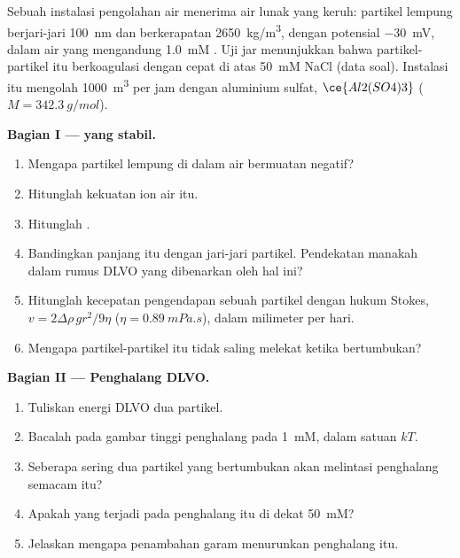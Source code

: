 \begin{problem}
\label{pb:b3:colloids:1}
Sebuah instalasi pengolahan air menerima air lunak yang keruh: partikel lempung
berjari-jari \qty{100}{nm} dan berkerapatan \qty{2650}{kg/m^3}, dengan potensial  \qty{-30}{mV}, dalam
air yang mengandung \qty{1.0}{mM} . Uji jar menunjukkan bahwa partikel-partikel itu berkoagulasi
dengan cepat di atas \qty{50}{mM} NaCl (data soal). Instalasi itu mengolah \qty{1000}{m^3} per
jam dengan aluminium sulfat, $\ce{Al2(SO4)3}$ ($M = \qty{342.3}{g/mol}$).

\medskip\noindent\textbf{Bagian I ---  yang stabil.}
\begin{enumerate}[beginpenalty=10000]
  \item Mengapa partikel lempung di dalam air bermuatan negatif?
  \item Hitunglah kekuatan ion air itu.
  \item Hitunglah .
  \item Bandingkan panjang itu dengan jari-jari partikel. Pendekatan manakah dalam rumus DLVO
        yang dibenarkan oleh hal ini?
  \item Hitunglah kecepatan pengendapan sebuah partikel dengan hukum Stokes, $v =
        2\Delta\rho\,gr^2/9\eta$ ($\eta = \qty{0.89}{mPa.s}$), dalam milimeter per hari.
  \item Mengapa partikel-partikel itu tidak saling melekat ketika bertumbukan?
\end{enumerate}

\medskip\noindent\textbf{Bagian II --- Penghalang DLVO.}
\begin{enumerate}[resume, beginpenalty=10000]
  \item Tuliskan energi DLVO dua partikel.
  \item Bacalah pada gambar tinggi penghalang pada \qty{1}{mM}, dalam satuan $kT$.
  \item Seberapa sering dua partikel yang bertumbukan akan melintasi penghalang semacam itu?
  \item Apakah yang terjadi pada penghalang itu di dekat \qty{50}{mM}?
  \item Jelaskan mengapa penambahan garam menurunkan penghalang itu.
\end{enumerate}


\end{problem}
